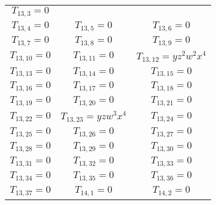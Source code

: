 \documentclass[12pt]{memoireuqam1.3}
\begin{document}
\begin{longtable}{|c|c|c|}
$T_{13,3}= 0$\\

$T_{13,4}= 0$&

$T_{13,5}= 0$&

$T_{13,6}= 0$\\

$T_{13,7}= 0$&

$T_{13,8}= 0$&

$T_{13,9}= 0$\\

$T_{13,10}= 0$&

$T_{13,11}= 0$&

$T_{13,12}= yz^2w^2x^4$\\

$T_{13,13}= 0$&

$T_{13,14}= 0$&

$T_{13,15}= 0$\\

$T_{13,16}= 0$&

$T_{13,17}= 0$&

$T_{13,18}= 0$\\

$T_{13,19}= 0$&

$T_{13,20}= 0$&

$T_{13,21}= 0$\\

$T_{13,22}= 0$&

$T_{13,23}= yzw^3x^4$&

$T_{13,24}= 0$\\

$T_{13,25}= 0$&

$T_{13,26}= 0$&

$T_{13,27}= 0$\\

$T_{13,28}= 0$&

$T_{13,29}= 0$&

$T_{13,30}= 0$\\

$T_{13,31}= 0$&

$T_{13,32}= 0$&

$T_{13,33}= 0$\\

$T_{13,34}= 0$&

$T_{13,35}= 0$&

$T_{13,36}= 0$\\

$T_{13,37}= 0$&

$T_{14,1}= 0$&

$T_{14,2}= 0$\\


\end{longtable}
\end{document}

